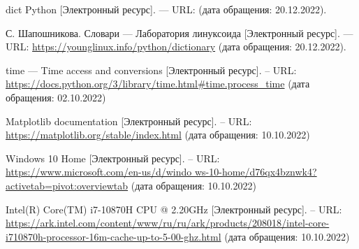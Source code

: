 
\renewcommand\bibname{Список использованных источников}
\begin{thebibliography}{}
 dict Python [Электронный ресурс]. --- URL: 
(дата обращения: 20.12.2022).

 С. Шапошникова. Словари — Лаборатория линуксоида [Электронный ресурс]. --- URL: \url{https://younglinux.info/python/dictionary} (дата обращения: 20.12.2022).



 time — Time access and conversions [Электронный ресурс]. -- URL: \url{https://docs.python.org/3/library/time.html#time.process_time} (дата обращения: 02.10.2022)

 Matplotlib documentation [Электронный ресурс]. -- URL: \url{https://matplotlib.org/stable/index.html} (дата обращения: 10.10.2022)

 Windows 10 Home [Электронный ресурс]. -- URL: \url{https://www.microsoft.com/en-us/d/windo ws-10-home/d76qx4bznwk4?activetab=pivot:overviewtab} (дата обращения: 10.10.2022)

 Intel(R) Core(TM) i7-10870H CPU @ 2.20GHz [Электронный ресурс]. -- URL: \url{https://ark.intel.com/content/www/ru/ru/ark/products/208018/intel-core-i710870h-processor-16m-cache-up-to-5-00-ghz.html} (дата обращения: 10.10.2022)

\end{thebibliography}